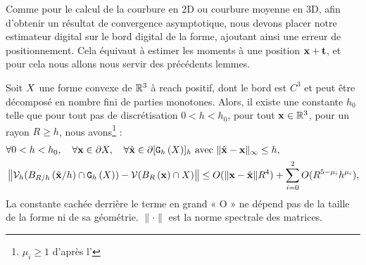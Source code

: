 Comme pour le calcul de la courbure en 2D ou courbure moyenne en 3D, afin d'obtenir un
résultat de convergence asymptotique, nous devons placer notre estimateur
digital sur le bord digital de la forme, ajoutant ainsi une erreur de positionnement.
Cela équivaut à estimer les moments à une position $\mathbf{x} + \mathbf{t}$, et pour cela
nous allons nous servir des précédents lemmes.
%
\begin{theorem}{}
\label{thm:multigrid-conv-cov-matrix}
%
  Soit $X$ une forme convexe de $\mathbb{R}^3$ à reach positif, dont le bord est
  $C^3$ et peut être décomposé en nombre fini de parties monotones. Alors, il
  existe une constante $h_0$ telle que pour tout pas de discrétisation $0 < h <
  h_0$, pour tout $\mathbf{x} \in \mathbb{R}^3$, pour un rayon $R \ge h$, nous
  avons\footnote{$\mu_i \ge 1$ d'après
  l'} :
%
  \begin{align}
    &\forall 0 < h < h_0, \quad \forall \mathbf{x} \in \partial X, \quad
    \forall \hat{\mathbf{x}} \in \partial \lbrack \mathtt{G}_{h}\left(X\right) \rbrack_{h} \text{~avec~} \| \hat{\mathbf{x}} -\mathbf{x}\|_\infty \le h, \nonumber \\
    &\left\| \mathcal{V}_{h}( B_{R/h}\left(\hat{\mathbf{x}}/h\right) \cap  \mathtt{G}_{h}\left(X\right) ) - \mathcal{V}( B_{R}\left(\mathbf{x}\right) \cap X )\right \|\le O(\|\mathbf{x}-\hat{\mathbf{x}}\| R^4) + \sum_{i=0}^2 O(R^{5-\mu_i}h^{\mu_i}),
  \end{align}
  La constante cachée derrière le terme en grand « O » ne dépend pas de la
  taille de la forme ni de sa géométrie. $\|\cdot\|$ est la norme spectrale des
  matrices.
\end{theorem}

